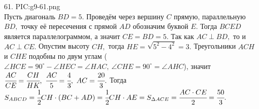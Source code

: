 61. {{PIC:g9-61.png}}\\
Пусть диагональ $BD=5.$ Проведём через вершину $C$ прямую, параллельную $BD,$ точку её пересечения с прямой $AD$ обозначим буквой $E.$ Тогда $BCED$ является параллелограммом, а значит $CE=BD=5.$ Так как $AC\perp BD,$ то и $AC\perp CE.$ Опустим высоту $CH,$ тогда $HE=\sqrt{5^2-4^2}=3.$ Треугольники $ACH$ и $CHE$ подобны по двум углам ($\angle HCE=90^\circ-\angle HEC=\angle HAC,\ \angle CHE=90^\circ=\angle AHC$), значит $\cfrac{AC}{CE}=\cfrac{CH}{HK},\ \cfrac{AC}{5}=\cfrac{4}{3},\ AC=\cfrac{20}{3}.$ Тогда $S_{ABCD}=\cfrac{1}{2}CH\cdot(BC+AD)=\cfrac{1}{2}CH\cdot AE=S_{\Delta ACE}=\cfrac{AC\cdot CE}{2}=\cfrac{50}{3}.$\\
